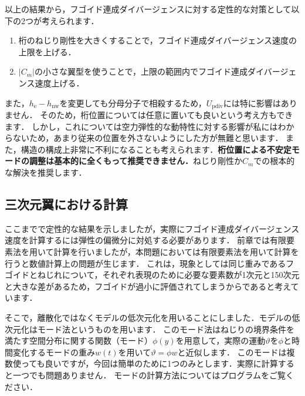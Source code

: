 \documentclass{jarticle}
\begin{document}
以上の結果から，フゴイド連成ダイバージェンスに対する定性的な対策として以下の2つが考えられます．
\begin{enumerate}
    \item 桁のねじり剛性を大きくすることで，フゴイド連成ダイバージェンス速度の上限を上げる．
    \item $|C_m|$の小さな翼型を使うことで，上限の範囲内でフゴイド連成ダイバージェンス速度上げる．
\end{enumerate}
また，$h_\mathrm{e}-h_\mathrm{nw}$を変更しても分母分子で相殺するため，$U_\mathrm{pdiv}$には特に影響はありません．
そのため，桁位置については任意に置いても良いという考え方もできます．
しかし，これについては空力弾性的な動特性に対する影響が私にはわからないため，あまり従来の位置を外さないようにした方が無難と思います．
また，構造の構成上非常に不利になることも考えられます．\textbf{桁位置による不安定モードの調整は基本的に全くもって推奨できません．}ねじり剛性か$C_m$での根本的な解決を推奨します．

\subsection{三次元翼における計算}

ここまでで定性的な結果を示しましたが，実際にフゴイド連成ダイバージェンス速度を計算するには弾性の偏微分に対処する必要があります．
前章では有限要素法を用いて計算を行いましたが，本問題においては有限要素法を用いて計算を行うと数値計算上の問題が生じます．
これは，現象としては同じ重みであるフゴイドとねじれについて，それぞれ表現のために必要な要素数が1次元と150次元と大きな差があるため，フゴイドが過小に評価されてしまうからであると考えています．

そこで，離散化ではなくモデルの低次元化を用いることにしました．モデルの低次元化はモード法というものを用います．
このモード法はねじりの境界条件を満たす空間分布に関する関数（モード）$\phi(y)$を用意して，実際の運動$\vartheta$を$\phi$と時間変化するモードの重み$w(t)$を用いて$\vartheta=\phi w$と近似します．
このモードは複数使っても良いですが，今回は簡単のために1つのみとします．実際に計算すると一つでも問題ありません．
モードの計算方法についてはプログラムをご覧ください．
\end{document}
